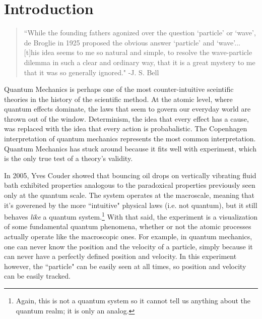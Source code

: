 		
\chapter*{Introduction}
\begin{quote}
	    ``While the founding fathers agonized over the question `particle' or `wave', de Broglie in 1925 proposed the obvious answer `particle' and `wave'... [t]his idea seems to me so natural and simple, to resolve the wave-particle dilemma in such a clear and ordinary way, that it is a great mystery to me that it was so generally ignored." -J. S. Bell
	    \end{quote}
	    

	    


Quantum Mechanics is perhaps one of the most counter-intuitive sceintific theories in the history of the scientific method. At the atomic level, where quantum effects dominate, the laws that seem to govern our everyday world are thrown out of the window. Determinism, the idea that every effect has a cause, was replaced with the idea that every action is probabalistic. The Copenhagen interpretation of quantum mechanics represents the most common interpretation. Quantum Mechanics has stuck around because it fits well with experiment, which is the only true test of a theory's validity. 

In 2005, Yves Couder showed that bouncing oil drops on vertically vibrating fluid bath exhibited properties analogous to the paradoxical properties previously seen only at the quantum scale.  The system operates at the macroscale, meaning that it's goverened by the more ``intuitive" physical laws (i.e. not quantum), but it still behaves \textit{like} a quantum system.\footnote{Again, this is not a quantum system so it cannot tell us anything about the quantum realm; it is only an analog.} With that said, the experiment is a visualization of some fundamental quantum phenomena, whether or not the atomic processes actually operate like the macroscopic ones. For example, in quantum mechanics, one can never know the position and the velocity of a particle, simply because it can never have a perfectly defined position and velocity. In this experiment however, the ``particle" can be easily seen at all times, so position and velocity can be easily tracked. 

